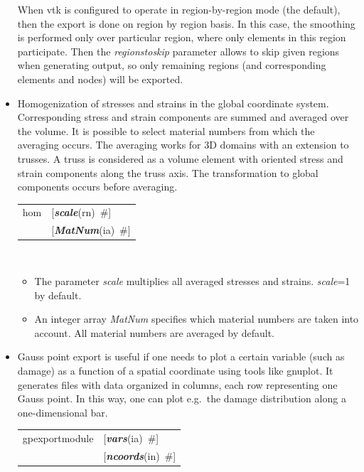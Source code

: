 \documentclass[a4paper]{article}
\makeatletter
\newcommand{\param}[1]{{\em #1}}
\newcommand{\keywordnotype}[1]{\mbox{{\it{\bf{#1}}}}}
\newcommand{\keyword}[2]{\mbox{{\keywordnotype{#1}\tiny (#2)}}}
\newcommand{\field}[2]{\mbox{\keyword{#1}{#2}~\#}}
\newcommand{\optField}[2]{\mbox{[\field{#1}{#2}]}}
\newenvironment{record}[1][]{\begin{tabular}{|ll}}{\end{tabular}\\}
\newcommand{\recentry}[2]{{#1}&{#2}\\}
\newcounter{rcc}
\newenvironment{record}[1][\textwidth]{\setcounter{rcc}{0}\begin{tabular*}{#1}{|ll@{\extracolsep{\fill}}r}}{\end{tabular*}\\}
\newcommand{\recentry}[2]{\ifthenelse{\value{rcc}>0}{&$\backslash$ \\}{\setcounter{rcc}{1}}{#1}&{#2}}
\makeatother
\begin{document}
\begin{itemize}
When vtk is configured to operate in region-by-region mode (the default), then the export is done on region by region basis. In this case, the smoothing is performed only over particular region, where only elements in this region participate. Then the \param{regionstoskip} parameter allows to skip given regions when generating output, so only remaining regions (and corresponding elements and nodes) will be exported.

\item Homogenization of stresses and strains in the global coordinate system. Corresponding stress and strain components are summed and averaged over the volume. It is possible to select material numbers from which the averaging occurs. The averaging works for 3D domains with an extension to trusses. A truss is considered as a volume element with oriented stress and strain components along the truss axis. The transformation to global components occurs before averaging.

\begin{record}[0.9\textwidth]
    \recentry{hom}{\optField{scale}{rn}} \recentry{}{\optField{MatNum}{ia}}
\end{record}
\begin{itemize}

\item The parameter \param{scale} multiplies all averaged stresses and strains. \param{scale}=1 by default.

\item An integer array \param{MatNum} specifies which material numbers are taken into account. All material numbers are averaged by default.
\end{itemize}

\item Gauss point export is useful if one needs to plot a certain variable
(such as damage) as a function of a spatial coordinate using tools like
gnuplot. It generates files with data organized in columns, each row
representing one Gauss point. In this way, one can plot e.g.\ the damage
distribution along a one-dimensional bar.

\begin{record}[0.9\textwidth]
    \recentry{gpexportmodule}{\optField{vars}{ia}} \recentry{}{\optField{ncoords}{in}}
  \end{record}


\end{itemize}
\end{document}
